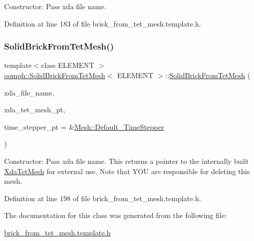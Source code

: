 Constructor\+: Pass xda file name. 



Definition at line 183 of file brick\+\_\+from\+\_\+tet\+\_\+mesh.\+template.\+h.

\mbox{\label{classoomph_1_1SolidBrickFromTetMesh_a6d45c13e6c02bb636b23e72d32240619}} 
\subsubsection{\texorpdfstring{Solid\+Brick\+From\+Tet\+Mesh()}{SolidBrickFromTetMesh()}\hspace{0.1cm}{\footnotesize\ttfamily [2/2]}}
{\footnotesize\ttfamily template$<$class E\+L\+E\+M\+E\+NT $>$ \\
\hyperlink{classoomph_1_1SolidBrickFromTetMesh}{oomph\+::\+Solid\+Brick\+From\+Tet\+Mesh}$<$ E\+L\+E\+M\+E\+NT $>$\+::\hyperlink{classoomph_1_1SolidBrickFromTetMesh}{Solid\+Brick\+From\+Tet\+Mesh} (\begin{DoxyParamCaption}\item[{const std\+::string}]{xda\+\_\+file\+\_\+name,  }\item[{\hyperlink{classoomph_1_1XdaTetMesh}{Xda\+Tet\+Mesh}$<$ \hyperlink{classoomph_1_1TElement}{T\+Element}$<$ 3, 3 $>$ $>$ $\ast$\&}]{xda\+\_\+tet\+\_\+mesh\+\_\+pt,  }\item[{\hyperlink{classoomph_1_1TimeStepper}{Time\+Stepper} $\ast$}]{time\+\_\+stepper\+\_\+pt = {\ttfamily \&\hyperlink{classoomph_1_1Mesh_a12243d0fee2b1fcee729ee5a4777ea10}{Mesh\+::\+Default\+\_\+\+Time\+Stepper}} }\end{DoxyParamCaption})\hspace{0.3cm}{\ttfamily [inline]}}



Constructor\+: Pass xda file name. This returns a pointer to the internally built \hyperlink{classoomph_1_1XdaTetMesh}{Xda\+Tet\+Mesh} for external use. Note that Y\+OU are responsible for deleting this mesh. 



Definition at line 198 of file brick\+\_\+from\+\_\+tet\+\_\+mesh.\+template.\+h.



The documentation for this class was generated from the following file\+:\begin{DoxyCompactItemize}
\item 
\hyperlink{brick__from__tet__mesh_8template_8h}{brick\+\_\+from\+\_\+tet\+\_\+mesh.\+template.\+h}\end{DoxyCompactItemize}
